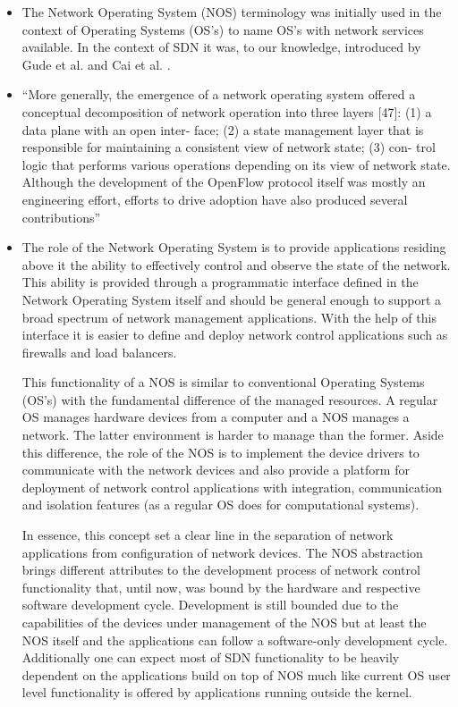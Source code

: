 \documentclass[12pt,openright,twoside]{report}
\begin{document}
\begin{itemize}
\begin{itemize}
\item The Network Operating System (NOS) terminology  was initially used in the
context of Operating Systems (OS's) to name OS's with network services available. In the
context of SDN it was, to our knowledge,
introduced by Gude et al. \cite{Gude:2008jd} and
Cai et al. \cite{Z.-Cai:2008fk}.

\item ``More generally, the emergence of a network operating system offered a conceptual decomposition of network operation into three layers [47]: (1) a data plane with an open inter- face; (2) a state management layer that is responsible for maintaining a consistent view of network state; (3) con- trol logic that performs various operations depending on its view of network state. Although the development of the OpenFlow protocol itself was mostly an engineering effort, efforts to drive adoption have also produced several contributions''

\item 
The role
of the Network Operating System is to provide
applications residing above it the ability to effectively control and
observe the state of the network. This ability is provided through a
programmatic interface defined in the Network Operating System itself and should be general
enough to support a broad spectrum of  network management
applications. With the help of this interface it is easier to define
and deploy network control applications such as firewalls and load
balancers. 

This functionality of a NOS is similar to conventional  Operating
Systems (OS's) with the fundamental difference of the managed resources. A
regular OS manages hardware devices from a computer 
and  a NOS manages a network.
The latter environment is harder to manage than the former. 
Aside this difference, the role of the NOS is to implement the
device drivers to communicate with the
network devices and also provide a platform for deployment of network
control applications with integration, communication and
isolation features (as a regular OS does for computational systems). 

In essence, this concept set a clear line in the separation of network applications
from configuration of network devices. The NOS abstraction brings different attributes to the development process of
network control functionality that, until now, was bound by the hardware and respective
software development cycle. Development is still bounded due to the
capabilities of the devices under management of the NOS but at least
the NOS itself and the applications can follow a software-only
development cycle. Additionally one can expect most of SDN functionality to be
heavily dependent   on the applications build on top of NOS much like
current  OS user level functionality is offered by applications
running outside the kernel.


\end{itemize}
\end{itemize}
\end{document}

